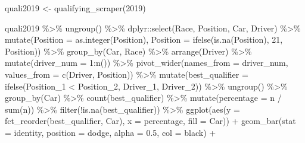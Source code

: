 \documentclass[
]{book}
\newenvironment{Shaded}{\begin{snugshade}}{\end{snugshade}}
\newcommand{\AttributeTok}[1]{\textcolor[rgb]{0.77,0.63,0.00}{#1}}
\newcommand{\DecValTok}[1]{\textcolor[rgb]{0.00,0.00,0.81}{#1}}
\newcommand{\FloatTok}[1]{\textcolor[rgb]{0.00,0.00,0.81}{#1}}
\newcommand{\FunctionTok}[1]{\textcolor[rgb]{0.00,0.00,0.00}{#1}}
\newcommand{\NormalTok}[1]{#1}
\newcommand{\OtherTok}[1]{\textcolor[rgb]{0.56,0.35,0.01}{#1}}
\newcommand{\SpecialCharTok}[1]{\textcolor[rgb]{0.00,0.00,0.00}{#1}}
\newcommand{\StringTok}[1]{\textcolor[rgb]{0.31,0.60,0.02}{#1}}
\begin{document}
\begin{Shaded}
\begin{Highlighting}[]
\NormalTok{quali2019 }\OtherTok{\textless{}{-}} \FunctionTok{qualifying\_scraper}\NormalTok{(}\DecValTok{2019}\NormalTok{)}

\NormalTok{quali2019 }\SpecialCharTok{\%\textgreater{}\%}
  \FunctionTok{ungroup}\NormalTok{() }\SpecialCharTok{\%\textgreater{}\%}
\NormalTok{  dplyr}\SpecialCharTok{::}\FunctionTok{select}\NormalTok{(Race, Position, Car, Driver) }\SpecialCharTok{\%\textgreater{}\%}
  \FunctionTok{mutate}\NormalTok{(}\AttributeTok{Position =} \FunctionTok{as.integer}\NormalTok{(Position),}
         \AttributeTok{Position =} \FunctionTok{ifelse}\NormalTok{(}\FunctionTok{is.na}\NormalTok{(Position), }\DecValTok{21}\NormalTok{, Position)) }\SpecialCharTok{\%\textgreater{}\%} 
  \FunctionTok{group\_by}\NormalTok{(Car, Race) }\SpecialCharTok{\%\textgreater{}\%} 
  \FunctionTok{arrange}\NormalTok{(Driver) }\SpecialCharTok{\%\textgreater{}\%} 
  \FunctionTok{mutate}\NormalTok{(}\AttributeTok{driver\_num =} \DecValTok{1}\SpecialCharTok{:}\FunctionTok{n}\NormalTok{()) }\SpecialCharTok{\%\textgreater{}\%} 
  \FunctionTok{pivot\_wider}\NormalTok{(}\AttributeTok{names\_from =} \StringTok{\textquotesingle{}driver\_num\textquotesingle{}}\NormalTok{, }\AttributeTok{values\_from =} \FunctionTok{c}\NormalTok{(}\StringTok{\textquotesingle{}Driver\textquotesingle{}}\NormalTok{, }\StringTok{\textquotesingle{}Position\textquotesingle{}}\NormalTok{)) }\SpecialCharTok{\%\textgreater{}\%}
  \FunctionTok{mutate}\NormalTok{(}\AttributeTok{best\_qualifier =} \FunctionTok{ifelse}\NormalTok{(Position\_1 }\SpecialCharTok{\textless{}}\NormalTok{ Position\_2, Driver\_1, Driver\_2)) }\SpecialCharTok{\%\textgreater{}\%}
  \FunctionTok{ungroup}\NormalTok{() }\SpecialCharTok{\%\textgreater{}\%}
  \FunctionTok{group\_by}\NormalTok{(Car) }\SpecialCharTok{\%\textgreater{}\%}
  \FunctionTok{count}\NormalTok{(best\_qualifier) }\SpecialCharTok{\%\textgreater{}\%}
  \FunctionTok{mutate}\NormalTok{(}\AttributeTok{percentage =}\NormalTok{ n }\SpecialCharTok{/} \FunctionTok{sum}\NormalTok{(n)) }\SpecialCharTok{\%\textgreater{}\%}
  \FunctionTok{filter}\NormalTok{(}\SpecialCharTok{!}\FunctionTok{is.na}\NormalTok{(best\_qualifier)) }\SpecialCharTok{\%\textgreater{}\%}
  \FunctionTok{ggplot}\NormalTok{(}\FunctionTok{aes}\NormalTok{(}\AttributeTok{y =} \FunctionTok{fct\_reorder}\NormalTok{(best\_qualifier, Car), }\AttributeTok{x =}\NormalTok{ percentage, }\AttributeTok{fill =}\NormalTok{ Car)) }\SpecialCharTok{+}
  \FunctionTok{geom\_bar}\NormalTok{(}\AttributeTok{stat =} \StringTok{\textquotesingle{}identity\textquotesingle{}}\NormalTok{, }\AttributeTok{position =} \StringTok{\textquotesingle{}dodge\textquotesingle{}}\NormalTok{, }\AttributeTok{alpha =} \FloatTok{0.5}\NormalTok{, }\AttributeTok{col =} \StringTok{\textquotesingle{}black\textquotesingle{}}\NormalTok{) }\SpecialCharTok{+}

\end{Highlighting}
\end{Shaded}
\end{document}
